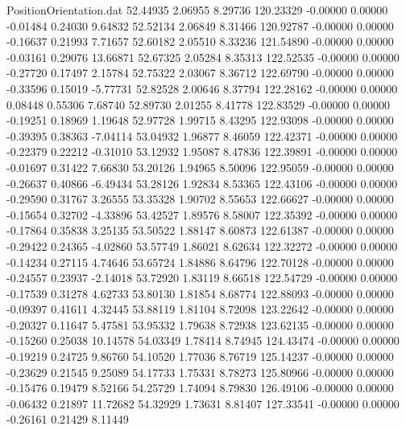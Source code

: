 \begin{filecontents}{PositionOrientation.dat}
  52.44935    2.06955    8.29736   120.23329   -0.00000    0.00000   -0.01484    0.24030    9.64832
  52.52134    2.06849    8.31466   120.92787   -0.00000    0.00000   -0.16637    0.21993    7.71657
  52.60182    2.05510    8.33236   121.54890   -0.00000    0.00000   -0.03161    0.29076   13.66871
  52.67325    2.05284    8.35313   122.52535   -0.00000    0.00000   -0.27720    0.17497    2.15784
  52.75322    2.03067    8.36712   122.69790   -0.00000    0.00000   -0.33596    0.15019   -5.77731
  52.82528    2.00646    8.37794   122.28162   -0.00000    0.00000    0.08448    0.55306    7.68740
  52.89730    2.01255    8.41778   122.83529   -0.00000    0.00000   -0.19251    0.18969    1.19648
  52.97728    1.99715    8.43295   122.93098   -0.00000    0.00000   -0.39395    0.38363   -7.04114
  53.04932    1.96877    8.46059   122.42371   -0.00000    0.00000   -0.22379    0.22212   -0.31010
  53.12932    1.95087    8.47836   122.39891   -0.00000    0.00000   -0.01697    0.31422    7.66830
  53.20126    1.94965    8.50096   122.95059   -0.00000    0.00000   -0.26637    0.40866   -6.49434
  53.28126    1.92834    8.53365   122.43106   -0.00000    0.00000   -0.29590    0.31767    3.26555
  53.35328    1.90702    8.55653   122.66627   -0.00000    0.00000   -0.15654    0.32702   -4.33896
  53.42527    1.89576    8.58007   122.35392   -0.00000    0.00000   -0.17864    0.35838    3.25135
  53.50522    1.88147    8.60873   122.61387   -0.00000    0.00000   -0.29422    0.24365   -4.02860
  53.57749    1.86021    8.62634   122.32272   -0.00000    0.00000   -0.14234    0.27115    4.74646
  53.65724    1.84886    8.64796   122.70128   -0.00000    0.00000   -0.24557    0.23937   -2.14018
  53.72920    1.83119    8.66518   122.54729   -0.00000    0.00000   -0.17539    0.31278    4.62733
  53.80130    1.81854    8.68774   122.88093   -0.00000    0.00000   -0.09397    0.41611    4.32445
  53.88119    1.81104    8.72098   123.22642   -0.00000    0.00000   -0.20327    0.11647    5.47581
  53.95332    1.79638    8.72938   123.62135   -0.00000    0.00000   -0.15260    0.25038   10.14578
  54.03349    1.78414    8.74945   124.43474   -0.00000    0.00000   -0.19219    0.24725    9.86760
  54.10520    1.77036    8.76719   125.14237   -0.00000    0.00000   -0.23629    0.21545    9.25089
  54.17733    1.75331    8.78273   125.80966   -0.00000    0.00000   -0.15476    0.19479    8.52166
  54.25729    1.74094    8.79830   126.49106   -0.00000    0.00000   -0.06432    0.21897   11.72682
  54.32929    1.73631    8.81407   127.33541   -0.00000    0.00000   -0.26161    0.21429    8.11449

\end{filecontents}
